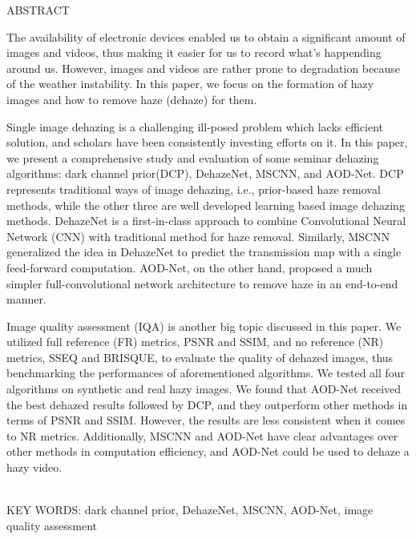 \documentclass[a4paper, 12pt, oneside]{report}
\renewcommand{\bibname}{\protect\leftline{参考文献}}
\newenvironment{englishabstract}[1]
{
\newcommand{\keywords}{#1}
\phantomsection
\addcontentsline{toc}{chapter}{Abstract\quad }

\begin{center}
ABSTRACT
\end{center}
}
{
\\[1\baselineskip]
KEY WORDS: \keywords
}
\begin{document}
\begin{englishabstract}{dark channel prior, DehazeNet, MSCNN, AOD-Net, image quality assessment}
\par The availability of electronic devices enabled us to obtain a significant amount of images and videos, thus making it easier for us to record what's happending around us. However, images and videos are rather prone to degradation because of the weather instability. In this paper, we focus on the formation of hazy images and how to remove haze (dehaze) for them.

Single image dehazing is a challenging ill-posed problem which lacks efficient solution, and scholars have been consistently investing efforts on it. In this paper, we present a comprehensive study and evaluation of some seminar dehazing algorithms: dark channel prior(DCP), DehazeNet, MSCNN, and AOD-Net. DCP represents traditional ways of image dehazing, i.e., prior-based haze removal methods, while the other three are well developed learning based image dehazing methods. DehazeNet is a first-in-class approach to combine Convolutional Neural Network (CNN) with traditional method for haze removal. Similarly, MSCNN generalized the idea in DehazeNet to predict the transmission map with a single feed-forward computation. AOD-Net, on the other hand, proposed a much simpler full-convolutional network architecture to remove haze in an end-to-end manner.  

Image quality assessment (IQA) is another big topic discussed in this paper. We utilized full reference (FR) metrics, PSNR and SSIM, and no reference (NR) metrics, SSEQ and BRISQUE, to evaluate the quality of dehazed images, thus benchmarking the performances of aforementioned algorithms. We tested all four algorithms on synthetic and real hazy images. We found that AOD-Net received the best dehazed results followed by DCP, and they outperform other methods in terms of PSNR and SSIM. However, the results are less consistent when it comes to NR metrics. Additionally, MSCNN and AOD-Net have clear advantages over other methods in computation efficiency, and AOD-Net could be used to dehaze a hazy video.   
\end{englishabstract}

\newpage

\pagestyle{empty}
\begingroup
\renewcommand{\leftline}{}
\renewcommand{\bibname}{}

{\fontsize{12pt}{18pt} \selectfont
\tableofcontents
}
\newpage
\endgroup
\end{document}
